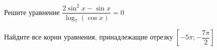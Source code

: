 \begin{ex}
	\begin{condition}
		\begin{enumcols}[label=\asbuk*)]
			\item Решите уравнение \( \dfrac{2\sin^2 x -\sin x}{\log_7 (\cos x)} = 0 \)
			\item Найдите все корни уравнения, принадлежащие отрезку \( \left[-5\pi;-\dfrac{7\pi}{2}\right] \)
		\end{enumcols}
	\end{condition}
\end{ex}